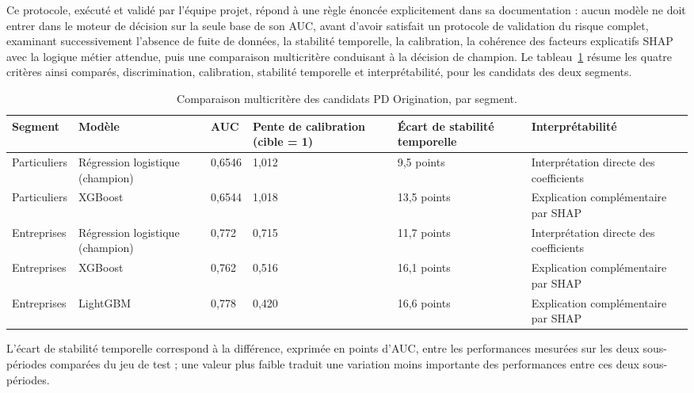 Ce protocole, exécuté et validé par l'équipe projet, répond à une règle énoncée explicitement dans sa documentation : aucun modèle ne doit entrer dans le moteur de décision sur la seule base de son AUC, avant d'avoir satisfait un protocole de validation du risque complet, examinant successivement l'absence de fuite de données, la stabilité temporelle, la calibration, la cohérence des facteurs explicatifs SHAP avec la logique métier attendue, puis une comparaison multicritère conduisant à la décision de champion. Le tableau~\ref{tab:comparaison-origination} résume les quatre critères ainsi comparés, discrimination, calibration, stabilité temporelle et interprétabilité, pour les candidats des deux segments.

\begin{table}[htbp]
    \centering
    \footnotesize
    \caption{Comparaison multicritère des candidats PD Origination, par segment.}
    \label{tab:comparaison-origination}
    \begin{tabular}{p{1.8cm}p{2.2cm}p{1.6cm}p{2.6cm}p{2.8cm}p{2.6cm}}
        \toprule
        \textbf{Segment} & \textbf{Modèle} & \textbf{AUC} & \textbf{Pente de calibration (cible = 1)} & \textbf{Écart de stabilité temporelle} & \textbf{Interprétabilité} \\
        \midrule
        Particuliers & Régression logistique (champion) & 0,6546 & 1,012 & 9,5 points & Interprétation directe des coefficients \\
        Particuliers & XGBoost & 0,6544 & 1,018 & 13,5 points & Explication complémentaire par SHAP \\
        \addlinespace
        Entreprises & Régression logistique (champion) & 0,772 & 0,715 & 11,7 points & Interprétation directe des coefficients \\
        Entreprises & XGBoost & 0,762 & 0,516 & 16,1 points & Explication complémentaire par SHAP \\
        Entreprises & LightGBM & 0,778 & 0,420 & 16,6 points & Explication complémentaire par SHAP \\
        \bottomrule
    \end{tabular}
\end{table}

L'écart de stabilité temporelle correspond à la différence, exprimée en points d'AUC, entre les performances mesurées sur les deux sous-périodes comparées du jeu de test ; une valeur plus faible traduit une variation moins importante des performances entre ces deux sous-périodes.

